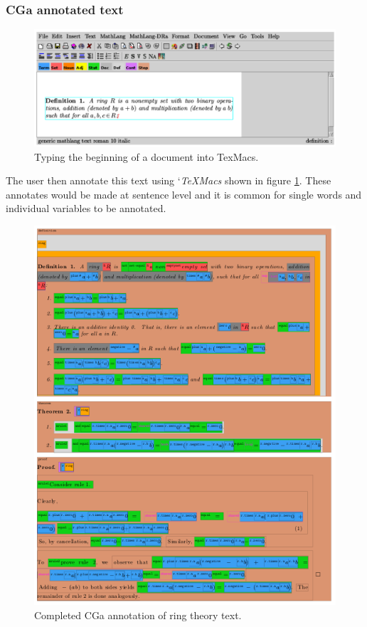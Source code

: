 \subsubsection{CGa annotated text}

\begin{figure}[H]
\begin{center}
\includegraphics[scale=0.4]{Figures/Background/texmacs.png}
\end{center}
\caption{Typing the beginning of a document into TexMacs. \label{fig:texmacs}}
\end{figure}

The user then annotate this text using `\emph{TeXMacs} shown in figure \ref{fig:texmacs}. These annotates would be made at sentence level and it is common for single words and individual variables to be annotated.

\begin{figure}[H]
\begin{center}
\includegraphics[scale=0.8]{Figures/Background/ringtheorycga.png}
\end{center}
\caption{Completed CGa annotation of ring theory text. \label{fig:ringcga}}
\end{figure}


